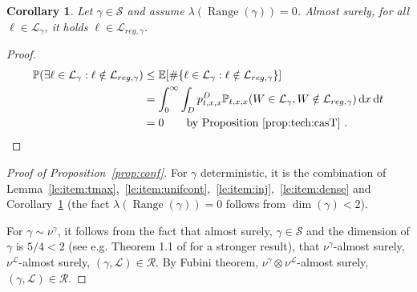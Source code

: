 \documentclass[11pt]{article}
\newtheorem{corollary}[theorem]{Corollary}
\def\d{\,{\rm d}}
\DeclareMathOperator{\Range}{Range}
\def\Conf{{\mathscr{R}}}
\begin{document}
\begin{corollary}
  \label{coro:item:reg}
  Let $\gamma\in \mathscr{S}$ and assume $\lambda(\Range(\gamma))=0$. Almost surely, for all $\ell\in \mathcal{L}_\gamma$, it holds $\ell\in \mathcal{L}_{reg,\gamma}$.
\end{corollary}
\begin{proof}
    \begin{align*}
    \mathbb{P}( \exists \ell \in \mathcal{L}_\gamma: \ell \notin \mathcal{L}_{reg,\gamma}   )
    &\leq \mathbb{E}[ \# \{ \ell \in \mathcal{L}_\gamma: \ell \notin \mathcal{L}_{reg,\gamma}   \}]\\
    &= \int_0^\infty \int_D p^D_{t,x,x} \mathbb{P}_{t,x,x}(  W \in \mathcal{L}_\gamma,W \notin \mathcal{L}_{reg,\gamma}  )	\d x \d t\\
    &=0 \qquad \text{by Proposition~\ref{prop:tech:casT} .}\qedhere
    \end{align*}
\end{proof}


\begin{proof}[Proof of Proposition~\ref{prop:conf}]
  For $\gamma$ deterministic,  it is the combination of Lemma~\ref{le:item:tmax},~\ref{le:item:unifcont},~\ref{le:item:inj},~\ref{le:item:dense}  and Corollary~\ref{coro:item:reg} (the fact $\lambda(\Range(\gamma))=0$ follows from $\dim(\gamma)<2$).

  For $\gamma\sim\nu^\gamma$, it follows from the fact that almost surely, $\gamma\in \mathscr{S}$ and the dimension of $\gamma$ is $5/4<2$ (see e.g. Theorem 1.1 of \cite{LawlerRezaei} for a stronger result), that $\nu^\gamma$-almost surely, $\nu^\mathcal{L}$-almost surely, $(\gamma,\mathcal{L})\in \Conf$. By Fubini theorem,
  $\nu^\gamma\otimes \nu^\mathcal{L}$-almost surely, $(\gamma,\mathcal{L})\in \Conf$.
\end{proof}
\end{document}
